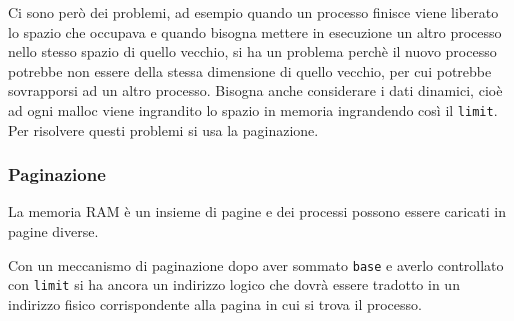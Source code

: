 \documentclass[a4paper]{article}
\theoremstyle{break}
\theoremstyle{break}
\theoremstyle{break}
\theoremstyle{break}
\begin{document}
\noindent Ci sono però dei problemi, ad esempio quando un processo finisce viene liberato lo spazio
che occupava e quando bisogna mettere in esecuzione un altro processo nello stesso spazio
di quello vecchio, si ha un problema perchè il nuovo processo potrebbe non essere della
stessa dimensione di quello vecchio, per cui potrebbe sovrapporsi ad un altro processo.
Bisogna anche considerare i dati dinamici, cioè ad ogni malloc viene ingrandito lo spazio
in memoria ingrandendo così il \texttt{limit}. Per risolvere questi problemi si usa la
paginazione.

\subsubsection{Paginazione}
La memoria RAM è un insieme di pagine e dei processi possono essere caricati in pagine
diverse.
\begin{figure}[H]
  \centering
\end{figure}
Con un meccanismo di paginazione dopo aver sommato \texttt{base} e averlo controllato
con \texttt{limit} si ha ancora un indirizzo logico che dovrà essere tradotto in un
indirizzo fisico corrispondente alla pagina in cui si trova il processo. 
\end{document}
